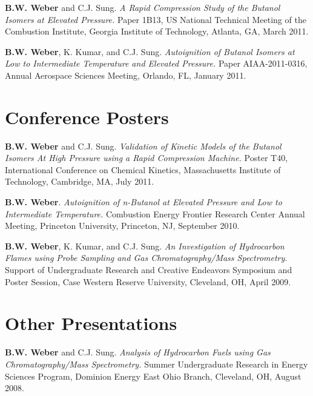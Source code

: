 \begin{bibsection}
\item[] \textbf{B.W. Weber} and C.J. Sung. \textit{A Rapid Compression
        Study of the Butanol Isomers at Elevated Pressure.} Paper 1B13,
          US National Technical Meeting of the Combustion
        Institute, Georgia Institute of Technology, Atlanta, GA, March
        2011.

\item[] \textbf{B.W. Weber}, K. Kumar, and C.J. Sung.
        \textit{Autoignition of Butanol Isomers at Low to Intermediate
        Temperature and Elevated Pressure.} Paper AIAA-2011-0316,
          Annual Aerospace Sciences Meeting, 
        Orlando, FL, January 2011.
\end{bibsection}

\section{Conference Posters}

\begin{bibsection}
\item[] \textbf{B.W. Weber} and C.J. Sung. \textit{Validation of
        Kinetic Models of the Butanol Isomers At High Pressure 
        using a Rapid Compression Machine.} Poster T40, 
         International Conference on Chemical Kinetics,
         Massachusetts Institute of Technology, Cambridge, MA,
         July 2011.

\item[] \textbf{B.W. Weber}. \textit{Autoignition of n-Butanol at
        Elevated Pressure and Low to Intermediate Temperature.} 
         Combustion Energy Frontier Research Center
        Annual Meeting, Princeton University, Princeton, NJ, 
        September 2010.

\item[] \textbf{B.W. Weber}, K. Kumar, and C.J. Sung. \textit{An
        Investigation of Hydrocarbon Flames using Probe Sampling and
        Gas Chromatography/Mass Spectrometry.} Support of Undergraduate
        Research and Creative Endeavors Symposium and Poster Session,
        Case Western Reserve University, Cleveland, OH, April 2009.
\end{bibsection}

\section{Other Presentations}

\begin{bibsection}
\item[] \textbf{ B.W. Weber} and C.J. Sung. \textit{Analysis of
        Hydrocarbon Fuels using Gas Chromatography/Mass Spectrometry.}
        Summer Undergraduate Research in Energy Sciences Program,
        Dominion Energy East Ohio Branch, Cleveland, OH, August 2008.
\end{bibsection}

